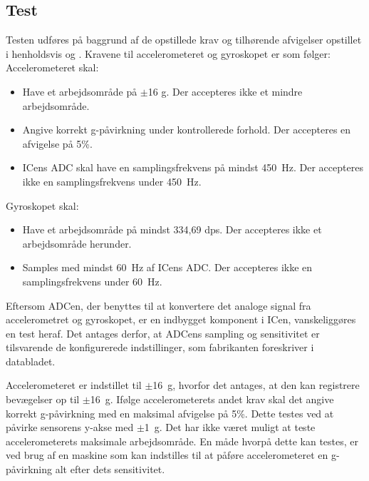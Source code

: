 \subsection{Test}
Testen udføres på baggrund af de opstillede krav og tilhørende afvigelser opstillet i henholdsvis  og . Kravene til accelerometeret og gyroskopet er som følger:\\
Accelerometeret skal:
\begin{itemize}
\item Have et arbejdsområde på $\pm$16 g. Der accepteres ikke et mindre arbejdsområde.
\item Angive korrekt g-påvirkning under kontrollerede forhold. Der accepteres en afvigelse på 5\%.
\item ICens ADC skal have en samplingsfrekvens på mindst 450~Hz. Der accepteres ikke en samplingsfrekvens under 450~Hz.
\end{itemize}
Gyroskopet skal:
\begin{itemize}
\item Have et arbejdsområde på mindst 334,69 dps. Der accepteres ikke et arbejdsområde herunder.
\item Samples med mindst 60~Hz af ICens ADC. Der accepteres ikke en samplingsfrekvens under 60~Hz.
\end{itemize}
Eftersom ADCen, der benyttes til at konvertere det analoge signal fra accelerometret og gyroskopet, er en indbygget komponent i ICen, vanskeliggøres en test heraf. Det antages derfor, at ADCens sampling og sensitivitet er tilsvarende de konfigurerede indstillinger, som fabrikanten foreskriver i databladet. \citep{STMicroelectronics2016}

Accelerometeret er indstillet til $\pm$16~g, hvorfor det antages, at den kan registrere bevægelser op til $\pm$16~g. Ifølge accelerometerets andet krav skal det angive korrekt g-påvirkning med en maksimal afvigelse på 5\%. Dette testes ved at påvirke sensorens y-akse med $\pm$1~g. Det har ikke været muligt at teste accelerometerets maksimale arbejdsområde. En måde hvorpå dette kan testes, er ved brug af en maskine som kan indstilles til at påføre accelerometeret en g-påvirkning alt efter dets sensitivitet. 

